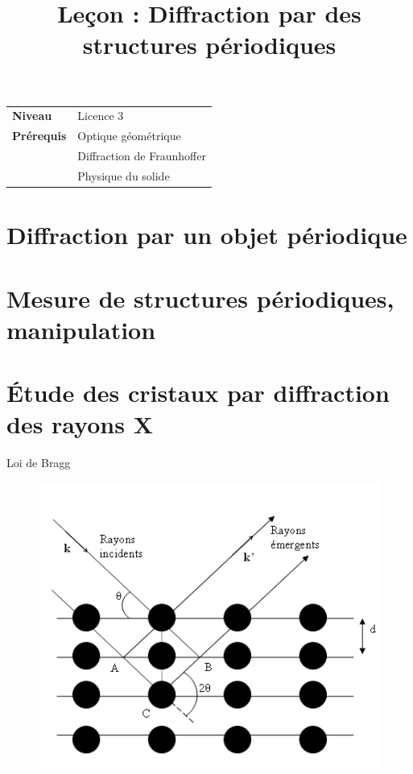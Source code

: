 \documentclass[10pt]{beamer}
\title{Leçon : Diffraction par des structures périodiques}
\begin{document}
\begin{frame}{}
    \titlepage

    \begin{tabularx}{\textwidth}{l@{:\,\,}X}
        \textbf{Niveau} 	  & Licence 3\\
        \textbf{Prérequis} & Optique géométrique \\
        & Diffraction de Fraunhoffer\\
        & Physique du solide
        
    \end{tabularx}
\end{frame}

\begin{frame}
    \tableofcontents
\end{frame}

\section{Diffraction par un objet périodique}
\section{Mesure de structures périodiques, manipulation}
\section{Étude des cristaux par diffraction des rayons X}
\begin{frame}{Loi de Bragg}
    \begin{figure}
        \centering
        \includegraphics[width=.7\textwidth]{ReseauDeBragg.png}
    \end{figure}
\end{frame}
\end{document}
